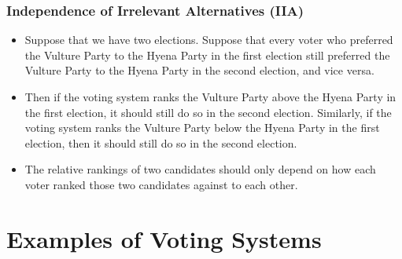 \documentclass{beamer}
\begin{document}
    \begin{frame}
        \frametitle{Independence of Irrelevant Alternatives (IIA)}
    
        \begin{itemize}
            \item Suppose that we have two elections. Suppose that every voter who preferred the Vulture Party to the Hyena Party in the first election still preferred the Vulture Party to the Hyena Party in the second election, and vice versa. \pause

            \item Then if the voting system ranks the Vulture Party above the Hyena Party in the first election, it should still do so in the second election. Similarly, if the voting system ranks the Vulture Party below the Hyena Party in the first election, then it should still do so in the second election. \pause

            \item The relative rankings of two candidates should only depend on how each voter ranked those two candidates against to each other.
        \end{itemize}

    \end{frame}

    \section{Examples of Voting Systems}
\end{document}
